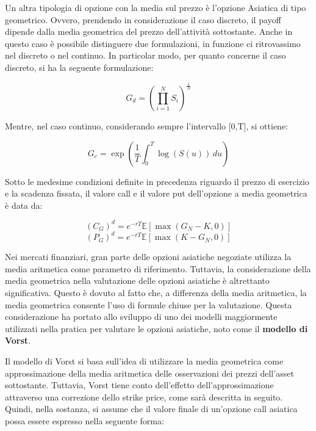 \documentclass[12pt,a4paper]{report}
\begin{document}
Un altra tipologia di opzione con la media sul prezzo è l'opzione Asiatica di tipo geometrico. Ovvero, prendendo in considerazione il caso discreto, il payoff dipende dalla media geometrica del prezzo dell'attività sottostante. Anche in questo caso è possibile distinguere due formulazioni, in funzione ci ritrovassimo nel discreto o nel continuo. In particolar modo, per quanto concerne il caso discreto, si ha la seguente formulazione:

\begin{equation}
    G_d = \left(\prod_{i=1}^{N} S_i\right)^{\frac{1}{N}} \label{eq:geom}
\end{equation}

Mentre, nel caso continuo, considerando sempre l'intervallo [0,T], si ottiene:

\begin{equation}
    G_c = \exp\left(\frac{1}{T} \int_{0}^{T} \log(S(u)) \, du\right)
\end{equation}


Sotto le medesime condizioni definite in precedenza riguardo il prezzo di esercizio e la scadenza fissata, il valore call e il valore put dell'opzione a media geometrica è data da:



\begin{equation}
    (C_G)^d = e^{-rT}\mathbb{E}\left[\max(G_N - K, 0)\right]
    \end{equation}
    \begin{equation}
    (P_G)^d = e^{-rT}\mathbb{E}\left[\max(K - G_N, 0)\right]
\end{equation}


Nei mercati finanziari, gran parte delle opzioni asiatiche negoziate utilizza la media aritmetica come parametro di riferimento. Tuttavia, la considerazione della media geometrica nella valutazione delle opzioni asiatiche è altrettanto significativa. Questo è dovuto al fatto che, a differenza della media aritmetica, la media geometrica consente l'uso di formule chiuse per la valutazione. Questa considerazione ha portato allo sviluppo di uno dei modelli maggiormente utilizzati nella pratica per valutare le opzioni asiatiche, noto come il \textbf{modello di Vorst}.

Il modello di Vorst si basa sull'idea di utilizzare la media geometrica come approssimazione della media aritmetica delle osservazioni dei prezzi dell'asset sottostante. Tuttavia, Vorst tiene conto dell'effetto dell'approssimazione attraverso una correzione dello strike price, come sarà descritta in seguito. Quindi, nella sostanza, si assume che il valore finale di un'opzione call asiatica possa essere espresso nella seguente forma: 
\end{document}
